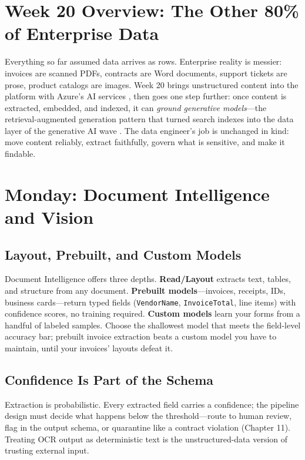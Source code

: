 \section{Week 20 Overview: The Other 80\% of Enterprise Data}
Everything so far assumed data arrives as rows. Enterprise reality is messier: invoices are scanned PDFs, contracts are Word documents, support tickets are prose, product catalogs are images. Week 20 brings unstructured content into the platform with Azure's AI services \cite{microsoft2025docIntelligence}, then goes one step further: once content is extracted, embedded, and indexed, it can \emph{ground generative models}---the retrieval-augmented generation pattern that turned search indexes into the data layer of the generative AI wave \cite{microsoft2025azureOpenAI}. The data engineer's job is unchanged in kind: move content reliably, extract faithfully, govern what is sensitive, and make it findable.

\section{Monday: Document Intelligence and Vision}

\subsection{Layout, Prebuilt, and Custom Models}
Document Intelligence offers three depths. \textbf{Read/Layout} extracts text, tables, and structure from any document. \textbf{Prebuilt models}---invoices, receipts, IDs, business cards---return typed fields (\texttt{VendorName}, \texttt{InvoiceTotal}, line items) with confidence scores, no training required. \textbf{Custom models} learn your forms from a handful of labeled samples. Choose the shallowest model that meets the field-level accuracy bar; prebuilt invoice extraction beats a custom model you have to maintain, until your invoices' layouts defeat it.

\subsection{Confidence Is Part of the Schema}
Extraction is probabilistic. Every extracted field carries a confidence; the pipeline design must decide what happens below the threshold---route to human review, flag in the output schema, or quarantine like a contract violation (Chapter 11). Treating OCR output as deterministic text is the unstructured-data version of trusting external input.

